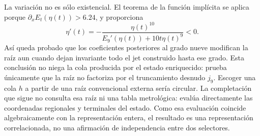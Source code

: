 La variación no es sólo existencial. El teorema de la función implícita se
aplica porque \(\partial_xE_t(\eta(t))>6.24\), y proporciona
\begin{equation}
 \eta'(t)=-
 \frac{\eta(t)^{10}}
 {E_9'(\eta(t))+10t\eta(t)^9}<0.
 \label{eq:alpha-variacion-raiz-prolongacion}
\end{equation}
Así queda probado que los coeficientes posteriores al grado nueve modifican
la raíz aun cuando dejan invariante todo el jet construido hasta ese grado.
Esta conclusión no niega la cola producida por el estado enriquecido: prueba
únicamente que la raíz no factoriza por el truncamiento desnudo
\(j_9\). Escoger una cola \(h\) a partir de una raíz convencional externa
sería circular. La completación que sigue no consulta esa raíz ni una tabla
metrológica: evalúa directamente las coordenadas regionales y terminales del
estado. Como esa evaluación coincide algebraicamente con la representación
entera, el resultado es una representación correlacionada, no una afirmación
de independencia entre dos selectores.


